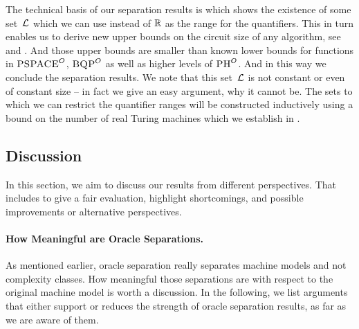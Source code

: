\documentclass{article}
\begin{document}
The technical basis of our separation results is  which shows the existence of some set~$\mathcal{L}$ which we can use instead of $\mathbb{R}$ as the range for the quantifiers.
This in turn enables us to derive new upper bounds on 
the circuit size of any \RPH algorithm, see  and .
And those upper bounds are smaller than known lower bounds for functions in $\textsc{PSPACE}^O$, $\textsc{BQP}^O$ as well as higher levels of $\textsc{PH}^O$.
And in this way we conclude the separation results.
% 
We note that this set~$\mathcal{L}$ is not constant or even of constant size -- in fact we give an easy argument, why it cannot be.
The sets to which we can restrict the quantifier ranges will be constructed inductively using a bound on the number of real Turing machines which we establish in .
\subsection{Discussion}
\label{sec:discussion}

In this section, we aim to discuss our results from different perspectives.
That includes to give a fair evaluation, highlight shortcomings, and possible improvements or alternative perspectives.

\paragraph{How Meaningful are Oracle Separations.}
    As mentioned earlier, oracle separation really separates machine models and not complexity classes.
    How meaningful those separations are with respect to the original machine model is worth a discussion.
    In the following, we list arguments that either support or reduces the strength of oracle separation results, as far as we are aware of them.
    
\end{document}
